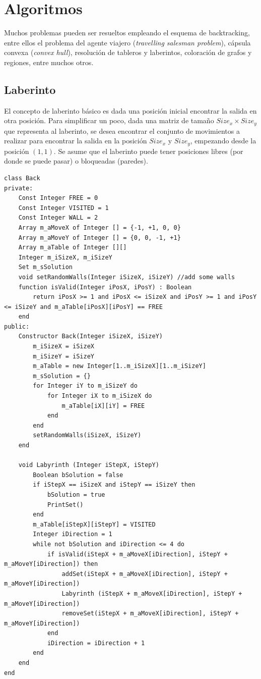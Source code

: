 \section{Algoritmos}

Muchos problemas pueden ser resueltos empleando el esquema de backtracking, entre ellos el problema del agente viajero (\textit{travelling salesman problem}), cápsula convexa (\textit{convex hull}), resolución de tableros y laberintos, coloración de grafos y regiones, entre muchos otros.

\subsection{Laberinto}

El concepto de laberinto básico es dada una posición inicial encontrar la salida en otra posición. Para simplificar un poco, dada una matriz de tamaño $Size_x \times Size_y$ que representa al laberinto, se desea encontrar el conjunto de movimientos a realizar para encontrar la salida en la posición $Size_x$ y $Size_y$, empezando desde la posición $(1,1)$. Se asume que el laberinto puede tener posiciones libres (por donde se puede pasar) o bloqueadas (paredes).

\begin{lstlisting}[upquote=true, language=pseudo]
class Back
private:
	Const Integer FREE = 0
	Const Integer VISITED = 1
	Const Integer WALL = 2
	Array m_aMoveX of Integer [] = {-1, +1, 0, 0}
	Array m_aMoveY of Integer [] = {0, 0, -1, +1}
	Array m_aTable of Integer [][]
	Integer m_iSizeX, m_iSizeY
	Set m_sSolution
	void setRandomWalls(Integer iSizeX, iSizeY)	//add some walls
	function isValid(Integer iPosX, iPosY) : Boolean
		return iPosX >= 1 and iPosX <= iSizeX and iPosY >= 1 and iPosY <= iSizeY and m_aTable[iPosX][iPosY] == FREE
	end
public:
	Constructor Back(Integer iSizeX, iSizeY)
		m_iSizeX = iSizeX
		m_iSizeY = iSizeY
		m_aTable = new Integer[1..m_iSizeX][1..m_iSizeY]
		m_sSolution = {}
		for Integer iY to m_iSizeY do
			for Integer iX to m_iSizeX do
				m_aTable[iX][iY] = FREE
			end
		end
		setRandomWalls(iSizeX, iSizeY)
	end

	void Labyrinth (Integer iStepX, iStepY)
		Boolean bSolution = false
		if iStepX == iSizeX and iStepY == iSizeY then
			bSolution = true
			PrintSet()
		end
		m_aTable[iStepX][iStepY] = VISITED
		Integer iDirection = 1
		while not bSolution and iDirection <= 4 do
			if isValid(iStepX + m_aMoveX[iDirection], iStepY + m_aMoveY[iDirection]) then
				addSet(iStepX + m_aMoveX[iDirection], iStepY + m_aMoveY[iDirection])
				Labyrinth (iStepX + m_aMoveX[iDirection], iStepY + m_aMoveY[iDirection])
				removeSet(iStepX + m_aMoveX[iDirection], iStepY + m_aMoveY[iDirection])
			end
			iDirection = iDirection + 1
		end
	end
end
\end{lstlisting}


